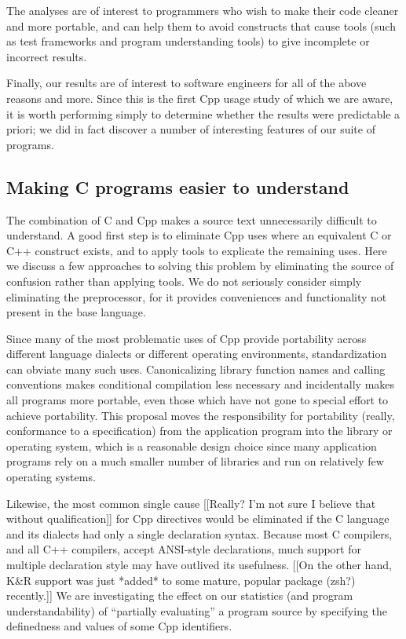 \documentclass[10pt]{article}
\begin{document}
The analyses are of interest to programmers who wish to make their code
cleaner and more portable, and can help them to avoid constructs that cause
tools (such as test frameworks and program understanding tools)
to give incomplete or incorrect results.


Finally, our results are of interest to software engineers for all of the
above reasons and more.  Since this is the first Cpp usage study of which
we are aware, it is worth performing simply to determine whether the
results were predictable a priori; we did in fact discover a number of
interesting features of our suite of programs.


\subsection{Making C programs easier to understand}

The combination of C and Cpp makes a source text unnecessarily difficult to
understand.  A good first step is to eliminate Cpp uses where an equivalent
C or C++ construct exists, and to apply tools to explicate the remaining
uses.  Here we discuss a few approaches to solving this problem by
eliminating the source of confusion rather than applying tools.  We do not
seriously consider simply eliminating the preprocessor, for it provides
conveniences and functionality not present in the base language.

Since many of the most problematic uses of Cpp provide portability across
different language dialects or different operating environments,
standardization can obviate many such uses.  Canonicalizing library
function names and calling conventions makes conditional compilation less
necessary and incidentally makes all programs more portable, even those
which have not gone to special effort to achieve portability.  This
proposal moves the responsibility for portability (really, conformance to a
specification) from the application program into the library or operating
system, which is a reasonable design choice since many application programs
rely on a much smaller number of libraries and run on relatively few
operating systems.

Likewise, the most common single cause [[Really?  I'm not sure I believe
that without qualification]] for Cpp directives would be eliminated if the
C language and its dialects had only a single declaration syntax.  Because
most C compilers, and all C++ compilers, accept ANSI-style declarations,
much support for multiple declaration style may have outlived its
usefulness.  [[On the other hand, K\&R support was just *added* to some
mature, popular package (zsh?) recently.]]  We are investigating the effect
on our statistics (and program understandability) of ``partially
evaluating'' a program source by specifying the definedness and values of
some Cpp identifiers.
\end{document}
